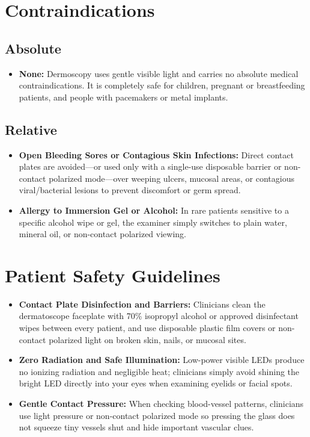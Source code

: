\section{Contraindications}

\subsection{Absolute}
\begin{itemize}
\item \textbf{None:} Dermoscopy uses gentle visible light and carries no absolute medical contraindications. It is completely safe for children, pregnant or breastfeeding patients, and people with pacemakers or metal implants.
\end{itemize}

\subsection{Relative}
\begin{itemize}
\item \textbf{Open Bleeding Sores or Contagious Skin Infections:} Direct contact plates are avoided---or used only with a single-use disposable barrier or non-contact polarized mode---over weeping ulcers, mucosal areas, or contagious viral/bacterial lesions to prevent discomfort or germ spread.
\item \textbf{Allergy to Immersion Gel or Alcohol:} In rare patients sensitive to a specific alcohol wipe or gel, the examiner simply switches to plain water, mineral oil, or non-contact polarized viewing.
\end{itemize}

\section{Patient Safety Guidelines}
\begin{itemize}
\item \textbf{Contact Plate Disinfection and Barriers:} Clinicians clean the dermatoscope faceplate with 70\% isopropyl alcohol or approved disinfectant wipes between every patient, and use disposable plastic film covers or non-contact polarized light on broken skin, nails, or mucosal sites.
\item \textbf{Zero Radiation and Safe Illumination:} Low-power visible LEDs produce no ionizing radiation and negligible heat; clinicians simply avoid shining the bright LED directly into your eyes when examining eyelids or facial spots.
\item \textbf{Gentle Contact Pressure:} When checking blood-vessel patterns, clinicians use light pressure or non-contact polarized mode so pressing the glass does not squeeze tiny vessels shut and hide important vascular clues.
\end{itemize}

